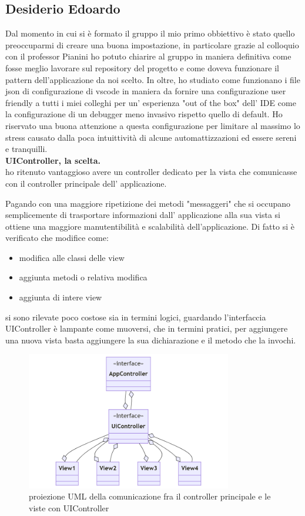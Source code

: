 \documentclass[a4paper,12pt]{report}
\begin{document}
\subsection{Desiderio Edoardo}
Dal momento in cui si è formato il gruppo il mio primo obbiettivo è stato quello preoccuparmi di creare una buona impostazione,
in particolare grazie al colloquio con il professor Pianini ho potuto chiarire al gruppo in maniera definitiva come fosse meglio
lavorare sul repository del progetto e come doveva funzionare il pattern dell'applicazione da noi scelto.
In oltre, ho studiato come funzionano i file json di configurazione di vscode in maniera da fornire una configurazione user friendly
a tutti i miei colleghi per un' esperienza "out of the box" dell' IDE come la configurazione di un debugger meno invasivo rispetto quello di  default.
Ho riservato una buona attenzione a questa configurazione per limitare al massimo lo stress causato dalla poca intuittività di alcune
automattizzazioni ed essere sereni e tranquilli.
\\\textbf{UIController, la scelta.}\\
ho ritenuto vantaggioso avere un controller dedicato per la vista  che comunicasse
con il controller principale dell' applicazione.

Pagando con una maggiore ripetizione dei metodi "messaggeri" che si occupano semplicemente di trasportare informazioni
dall' applicazione alla sua vista si ottiene una maggiore manutentibilità e scalabilità dell'applicazione.
Di fatto si è verificato che modifice come:
\begin{itemize}
    \item modifica alle classi delle view
    \item aggiunta metodi o relativa modifica
    \item aggiunta di intere view
\end{itemize}
si sono rilevate poco costose sia in termini logici, guardando l'interfaccia UIController è lampante come muoversi,
che in termini pratici, per aggiungere una nuova vista basta aggiungere la sua dichiarazione e il metodo che la invochi.
\begin{figure}[H]
    \centering
    \includegraphics[width=0.8\textwidth]{images/UiControllerDesing.png}
    \caption{proiezione UML della comunicazione fra il controller principale e le viste con UIController}
\end{figure}
\end{document}
